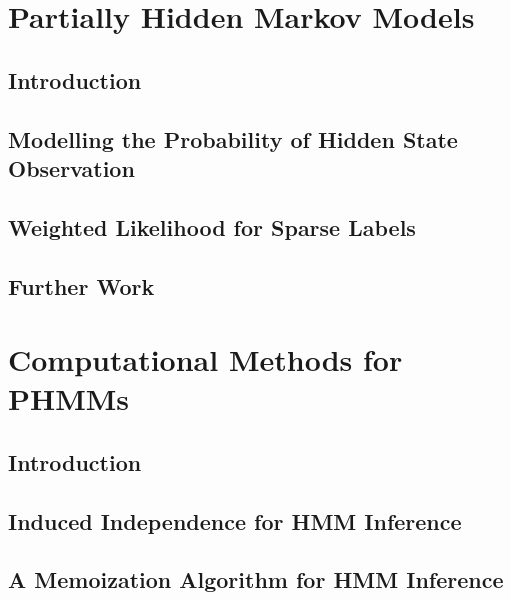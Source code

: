 \documentclass{report}
\begin{document}

\chapter{Partially Hidden Markov Models}

\section{Introduction}
\label{sec:intro_ss}


\section{Modelling the Probability of Hidden State Observation}
\label{sec:prob_obs_ss}


\section{Weighted Likelihood for Sparse Labels}
\label{sec:w_like_ss}


\section{Further Work}
\label{sec:fut_ss}



\chapter{Computational Methods for PHMMs}

\section{Introduction}


\section{Induced Independence for HMM Inference}


\section{A Memoization Algorithm for HMM Inference}

\end{document}
